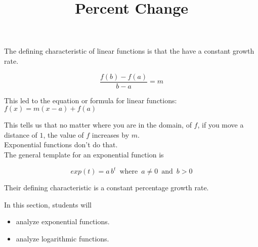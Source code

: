 \documentclass{ximera}
\title{Percent Change}
\begin{document}
\begin{abstract}
\end{abstract}
\maketitle








The defining characteristic of linear functions is that the have a constant growth rate.


\[   \frac{f(b)-f(a)}{b-a} = m       \]

This led to the equation or formula for linear functions:  $f(x) = m(x-a) + f(a)$


This tells us that no matter where you are in the domain, of $f$, if you move a distance of $1$, the value of $f$ increases by $m$. \\


Exponential functions don't do that. \\









The general template for an exponential function is 

\[   exp(t) = a \, b^t   \, \text{ where } \,  a \ne 0  \, \text{ and } \,    b > 0   \]



Their defining characteristic is a constant percentage growth rate.








\begin{sectionOutcomes}
In this section, students will 

\begin{itemize}
\item analyze exponential functions.
\item analyze logarithmic functions.
\end{itemize}
\end{sectionOutcomes}
\end{document}
